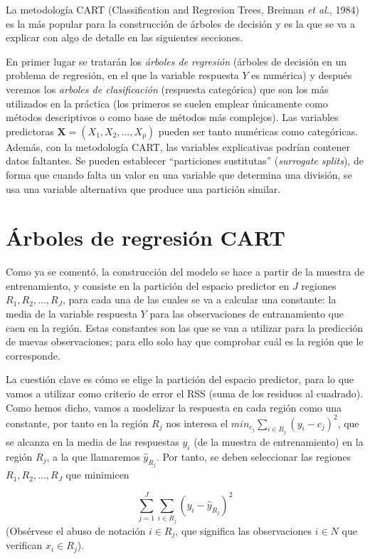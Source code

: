 \documentclass[]{book}
\theoremstyle{break}
\theoremstyle{definition}
\theoremstyle{definition}
\theoremstyle{definition}
\theoremstyle{remark}
\begin{document}
La metodología CART (Classification and Regresion Trees, Breiman
\emph{et al.}, 1984) es la más popular para la construcción de árboles
de decisión y es la que se va a explicar con algo de detalle en las
siguientes secciones.

En primer lugar se tratarán los \emph{árboles de regresión} (árboles de
decisión en un problema de regresión, en el que la variable respuesta
\(Y\) es numérica) y después veremos los \emph{arboles de clasificación}
(respuesta categórica) que son los más utilizados en la práctica (los
primeros se suelen emplear únicamente como métodos descriptivos o como
base de métodos más complejos). Las variables predictoras
\(\mathbf{X}=(X_1, X_2, \ldots, X_p)\) pueden ser tanto numéricas como
categóricas. Además, con la metodología CART, las variables explicativas
podrían contener datos faltantes. Se pueden establecer ``particiones
sustitutas'' (\emph{surrogate splits}), de forma que cuando falta un
valor en una variable que determina una división, se usa una variable
alternativa que produce una partición similar.

\section{Árboles de regresión
CART}\label{uxe1rboles-de-regresiuxf3n-cart}

Como ya se comentó, la construcción del modelo se hace a partir de la
muestra de entrenamiento, y consiste en la partición del espacio
predictor en \(J\) regiones \(R_1, R_2, \ldots, R_J\), para cada una de
las cuales se va a calcular una constante: la media de la variable
respuesta \(Y\) para las observaciones de entranamiento que caen en la
región. Estas constantes son las que se van a utilizar para la
predicción de nuevas observaciones; para ello solo hay que comprobar
cuál es la región que le corresponde.

La cuestión clave es cómo se elige la partición del espacio predictor,
para lo que vamos a utilizar como criterio de error el RSS (suma de los
residuos al cuadrado). Como hemos dicho, vamos a modelizar la respuesta
en cada región como una constante, por tanto en la región \(R_j\) nos
interesa el \(min_{c_j} \sum_{i\in R_j} (y_i - c_j)^2\), que se alcanza
en la media de las respuestas \(y_i\) (de la muestra de entrenamiento)
en la región \(R_j\), a la que llamaremos \(\widehat y_{R_j}\). Por
tanto, se deben seleccionar las regiones \(R_1, R_2, \ldots, R_J\) que
minimicen

\[\sum_{j=1}^{J} \sum_{i\in R_j} (y_i - \widehat y_{R_j})^2\] (Obsérvese
el abuso de notación \(i\in R_j\), que significa las observaciones
\(i\in N\) que verifican \(x_i \in R_j\)).
\end{document}
